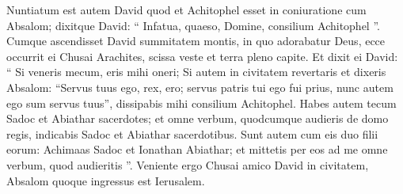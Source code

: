 \begin{biblechapter}
\begin{biblechapter}
\begin{biblechapter}
\begin{biblechapter}
\begin{biblechapter}
\begin{biblechapter}
\begin{biblechapter}
\begin{biblechapter}
\begin{biblechapter}
\begin{biblechapter}
\begin{biblechapter}
\begin{biblechapter}
\begin{biblechapter}
\begin{biblechapter}
\begin{biblechapter}
\verse Nuntiatum est autem David quod et Achitophel esset in coniuratione cum Absalom; dixitque David: “ Infatua, quaeso, Domine, consilium Achitophel ”.
 \verse Cumque ascendisset David summitatem montis, in quo adorabatur Deus, ecce occurrit ei Chusai Arachites, scissa veste et terra pleno capite. 
\verse Et dixit ei David: “ Si veneris mecum, eris mihi oneri; 
\verse Si autem in civitatem revertaris et dixeris Absalom: “Servus tuus ego, rex, ero; servus patris tui ego fui prius, nunc autem ego sum servus tuus”, dissipabis mihi consilium Achitophel. 
\verse Habes autem tecum Sadoc et Abiathar sacerdotes; et omne verbum, quodcumque audieris de domo regis, indicabis Sadoc et Abiathar sacerdotibus. 
\verse Sunt autem cum eis duo filii eorum: Achimaas Sadoc et Ionathan Abiathar; et mittetis per eos ad me omne verbum, quod audieritis ”.
 \verse Veniente ergo Chusai amico David in civitatem, Absalom quoque ingressus est Ierusalem.
 

\end{biblechapter}
\end{biblechapter}
\end{biblechapter}
\end{biblechapter}
\end{biblechapter}
\end{biblechapter}
\end{biblechapter}
\end{biblechapter}
\end{biblechapter}
\end{biblechapter}
\end{biblechapter}
\end{biblechapter}
\end{biblechapter}
\end{biblechapter}
\end{biblechapter}
